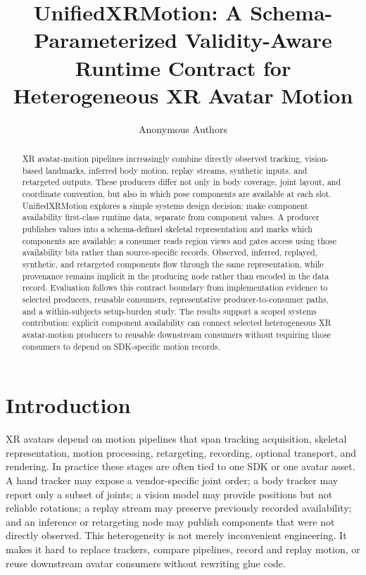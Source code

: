 \documentclass[runningheads]{llncs}
\begin{document}
\title{UnifiedXRMotion: A Schema-Parameterized Validity-Aware Runtime Contract for Heterogeneous XR Avatar Motion}
\author{Anonymous Authors}
\maketitle

\begin{abstract}
XR avatar-motion pipelines increasingly combine directly observed tracking, vision-based landmarks, inferred body motion, replay streams, synthetic inputs, and retargeted outputs. These producers differ not only in body coverage, joint layout, and coordinate convention, but also in which pose components are available at each slot. UnifiedXRMotion explores a simple systems design decision: make component availability first-class runtime data, separate from component values. A producer publishes values into a schema-defined skeletal representation and marks which components are available; a consumer reads region views and gates access using those availability bits rather than source-specific records. Observed, inferred, replayed, synthetic, and retargeted components flow through the same representation, while provenance remains implicit in the producing node rather than encoded in the data record. Evaluation follows this contract boundary from implementation evidence to selected producers, reusable consumers, representative producer-to-consumer paths, and a within-subjects setup-burden study. The results support a scoped systems contribution: explicit component availability can connect selected heterogeneous XR avatar-motion producers to reusable downstream consumers without requiring those consumers to depend on SDK-specific motion records.
\end{abstract}

\section{Introduction}\label{sec:introduction}
XR avatars depend on motion pipelines that span tracking acquisition, skeletal representation, motion processing, retargeting, recording, optional transport, and rendering. In practice these stages are often tied to one SDK or one avatar asset. A hand tracker may expose a vendor-specific joint order; a body tracker may report only a subset of joints; a vision model may provide positions but not reliable rotations; a replay stream may preserve previously recorded availability; and an inference or retargeting node may publish components that were not directly observed. This heterogeneity is not merely inconvenient engineering. It makes it hard to replace trackers, compare pipelines, record and replay motion, or reuse downstream avatar consumers without rewriting glue code.
\end{document}
